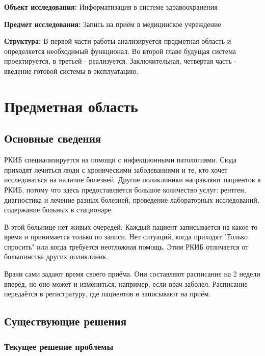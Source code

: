 \documentclass[a4paper,article]{article}
\begin{document}
        \textbf{Объект исследования:} Информатизация в системе здравоохранения

        \textbf{Предмет исследования:} Запись на приём в медицинское учреждение

        \textbf{Структура:} В первой части работы анализируется предметная область и определяется необходимый функционал. Во второй главе будущая система проектируется, в третьей - реализуется. Заключительная, четвертая часть - введение готовой системы в эксплуатацию.

        \newpage

    \section{Предметная область}

    \subsection{Основные сведения}

        РКИБ специализируется на помощи с инфекционными патологиями. Сюда приходят лечиться люди с хроническими заболеваниями и те, кто хочет исследоваться на наличие болезней. Другие поликлиники направляют пациентов в РКИБ, потому что здесь предоставляется большое количество услуг: рентген, диагностика и лечение разных болезней, проведение лабораторных исследований, содержание больных в стационаре.

        В этой больнице нет живых очередей. Каждый пациент записывается на какое-то время и принимается только по записи. Нет ситуаций, когда приходят "Только спросить" или когда требуется неотложная помощь. Этим РКИБ отличается от большинства других поликлиник.

        Врачи сами задают время своего приёма. Они составляют расписание на 2 недели вперёд, но оно может и измениться, например, если врач заболел. Расписание передаётся в регистратуру, где пациентов и записывают на приём.

    \subsection{Существующие решения}

    \subsubsection{Текущее решение проблемы}\label{Текущее решение проблемы}
\end{document}
